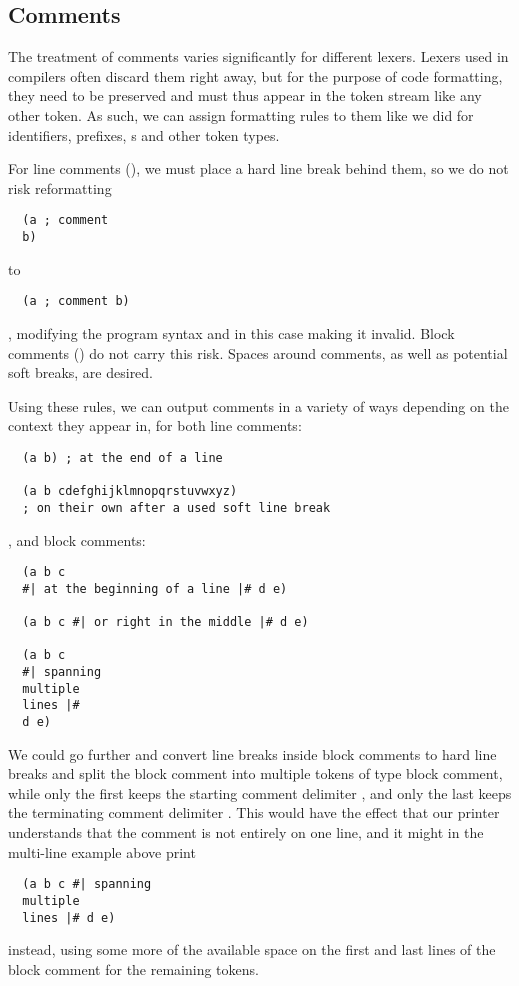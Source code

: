 \subsection{Comments}
The treatment of comments varies significantly for different lexers.
Lexers used in compilers often discard them right away,
but for the purpose of code formatting, they need to be preserved
and must thus appear in the token stream like any other token.
As such, we can assign formatting rules to them like we did for
identifiers, prefixes, s and other token types.

For line comments (\code{;}), we must place a hard line break behind them,
so we do not risk reformatting
\begin{verbatim}
  (a ; comment
  b)
\end{verbatim}
to
\begin{verbatim}
  (a ; comment b)
\end{verbatim}
, modifying the program syntax and in this case making it invalid.
Block comments (\code{#| |#}) do not carry this risk.
Spaces around comments, as well as potential soft breaks, are desired.

Using these rules, we can output comments in a variety of ways
depending on the context they appear in, for both line comments:
\begin{verbatim}
  (a b) ; at the end of a line

  (a b cdefghijklmnopqrstuvwxyz)
  ; on their own after a used soft line break
\end{verbatim}
, and block comments:
\begin{verbatim}
  (a b c
  #| at the beginning of a line |# d e)

  (a b c #| or right in the middle |# d e)

  (a b c
  #| spanning
  multiple
  lines |#
  d e)
\end{verbatim}

We could go further and convert line breaks inside block comments to hard line breaks
and split the block comment into multiple tokens of type block comment,
while only the first keeps the starting comment delimiter \code{#|},
and only the last keeps the terminating comment delimiter \code{|#}.
This would have the effect that our printer understands that the comment
is not entirely on one line, and it might in the multi-line example above print
\begin{verbatim}
  (a b c #| spanning
  multiple
  lines |# d e)
\end{verbatim}
instead, using some more of the available space
on the first and last lines of the block comment for the remaining tokens.

